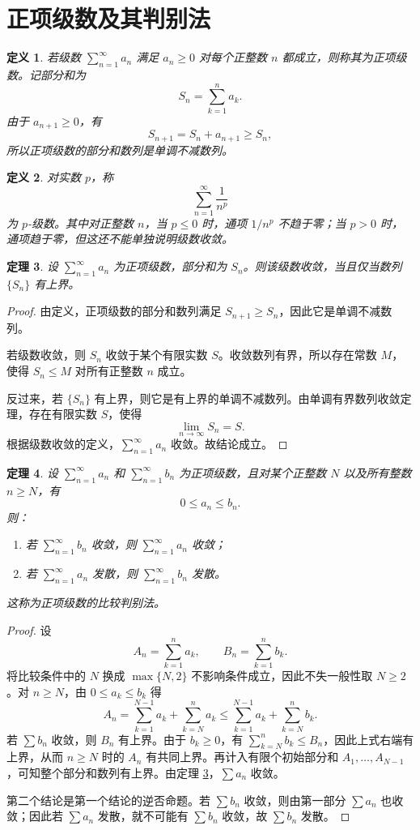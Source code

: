 \documentclass[UTF8,fontset=fandol,11pt]{ctexart}
\newtheorem{definition}{定义}[section]
\newtheorem{theorem}[definition]{定理}
\begin{document}
\section{正项级数及其判别法}\label{sec:S03}
\begin{definition}
若级数 $\sum_{n=1}^{\infty}a_n$ 满足 $a_n\geq 0$ 对每个正整数 $n$ 都成立，则称其为正项级数。记部分和为
\[
S_n=\sum_{k=1}^{n}a_k.
\]
由于 $a_{n+1}\geq0$，有
\[
S_{n+1}=S_n+a_{n+1}\geq S_n,
\]
所以正项级数的部分和数列是单调不减数列。\label{def:positive-series}
\end{definition}
\begin{definition}
对实数 $p$，称
\[
\sum_{n=1}^{\infty}\frac{1}{n^p}
\]
为 $p$-级数。其中对正整数 $n$，当 $p\leq0$ 时，通项 $1/n^p$ 不趋于零；当 $p>0$ 时，通项趋于零，但这还不能单独说明级数收敛。\label{def:p-series}
\end{definition}
\begin{theorem}
设 $\sum_{n=1}^{\infty}a_n$ 为正项级数，部分和为 $S_n$。则该级数收敛，当且仅当数列 $\{S_n\}$ 有上界。\label{thm:monotone-partial-sums}
\end{theorem}
\begin{proof}
由定义，正项级数的部分和数列满足 $S_{n+1}\geq S_n$，因此它是单调不减数列。

若级数收敛，则 $S_n$ 收敛于某个有限实数 $S$。收敛数列有界，所以存在常数 $M$，使得 $S_n\leq M$ 对所有正整数 $n$ 成立。

反过来，若 $\{S_n\}$ 有上界，则它是有上界的单调不减数列。由单调有界数列收敛定理，存在有限实数 $S$，使得
\[
\lim_{n\to\infty}S_n=S.
\]
根据级数收敛的定义，$\sum_{n=1}^{\infty}a_n$ 收敛。故结论成立。
\end{proof}
\begin{theorem}
设 $\sum_{n=1}^{\infty}a_n$ 和 $\sum_{n=1}^{\infty}b_n$ 为正项级数，且对某个正整数 $N$ 以及所有整数 $n\geq N$，有
\[
0\leq a_n\leq b_n.
\]
则：
\begin{enumerate}
\item 若 $\sum_{n=1}^{\infty}b_n$ 收敛，则 $\sum_{n=1}^{\infty}a_n$ 收敛；
\item 若 $\sum_{n=1}^{\infty}a_n$ 发散，则 $\sum_{n=1}^{\infty}b_n$ 发散。
\end{enumerate}
这称为正项级数的比较判别法。\label{thm:comparison}
\end{theorem}
\begin{proof}
设
\[
A_n=\sum_{k=1}^{n}a_k,\qquad B_n=\sum_{k=1}^{n}b_k.
\]
将比较条件中的 $N$ 换成 $\max\{N,2\}$ 不影响条件成立，因此不失一般性取 $N\geq2$。对 $n\geq N$，由 $0\leq a_k\leq b_k$ 得
\[
A_n=\sum_{k=1}^{N-1}a_k+\sum_{k=N}^{n}a_k
\leq \sum_{k=1}^{N-1}a_k+\sum_{k=N}^{n}b_k.
\]
若 $\sum b_n$ 收敛，则 $B_n$ 有上界。由于 $b_k\geq0$，有 $\sum_{k=N}^{n}b_k\leq B_n$，因此上式右端有上界，从而 $n\geq N$ 时的 $A_n$ 有共同上界。再计入有限个初始部分和 $A_1,\ldots,A_{N-1}$，可知整个部分和数列有上界。由定理 \ref{thm:monotone-partial-sums}，$\sum a_n$ 收敛。

第二个结论是第一个结论的逆否命题。若 $\sum b_n$ 收敛，则由第一部分 $\sum a_n$ 也收敛；因此若 $\sum a_n$ 发散，就不可能有 $\sum b_n$ 收敛，故 $\sum b_n$ 发散。
\end{proof}
\end{document}
